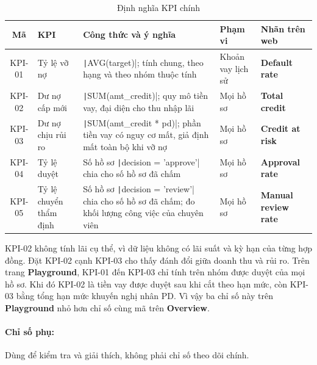 \begin{table}[H]
	\centering
	\caption{Định nghĩa KPI chính}
	\label{tab:kpi-main}
	\footnotesize
	\begin{tabular}{c p{2.4cm} p{5.6cm} p{2.6cm} p{2.6cm}}
		\toprule
		\textbf{Mã} & \textbf{KPI}           & \textbf{Công thức và ý nghĩa}                                                                                                             & \textbf{Phạm vi}  & \textbf{Nhãn trên web}      \\
		\midrule
		KPI-01      & Tỷ lệ vỡ nợ            & \texttt|AVG(target)|; tính chung, theo hạng và theo nhóm thuộc tính                                      & Khoản vay lịch sử & \textbf{Default rate}       \\
		KPI-02      & Dư nợ cấp mới          & \texttt|SUM(amt_credit)|; quy mô tiền vay, đại diện cho thu nhập lãi                                     & Mọi hồ sơ         & \textbf{Total credit}       \\
		KPI-03      & Dư nợ chịu rủi ro      & \texttt|SUM(amt_credit * pd)|; phần tiền vay có nguy cơ mất, giả định mất toàn bộ khi vỡ nợ              & Mọi hồ sơ         & \textbf{Credit at risk}     \\
		KPI-04      & Tỷ lệ duyệt            & Số hồ sơ \texttt|decision = 'approve'| chia cho số hồ sơ đã chấm                                         & Mọi hồ sơ         & \textbf{Approval rate}      \\
		KPI-05      & Tỷ lệ chuyển thẩm định & Số hồ sơ \texttt|decision = 'review'| chia cho số hồ sơ đã chấm; đo khối lượng công việc của chuyên viên & Mọi hồ sơ         & \textbf{Manual review rate} \\
		\bottomrule
	\end{tabular}
\end{table}

KPI-02 không tính lãi cụ thể, vì dữ liệu không có lãi suất và kỳ hạn của từng hợp đồng. Đặt KPI-02 cạnh KPI-03 cho thấy đánh đổi giữa doanh thu và rủi ro. Trên trang \textbf{Playground}, KPI-01 đến KPI-03 chỉ tính trên nhóm được duyệt của mọi hồ sơ. Khi đó KPI-02 là tiền vay được duyệt sau khi cắt theo hạn mức, còn KPI-03 bằng tổng hạn mức khuyến nghị nhân PD. Vì vậy ba chỉ số này trên \textbf{Playground} nhỏ hơn chỉ số cùng mã trên \textbf{Overview}.

\paragraph{Chỉ số phụ:} Dùng để kiểm tra và giải thích, không phải chỉ số theo dõi chính.

